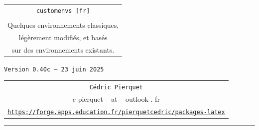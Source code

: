 \documentclass[french,11pt,a4paper]{article}
\def\TPversion{0.40c}
\def\TPdate{23 juin 2025}
\begin{document}
\pagestyle{fancy}

\thispagestyle{empty}

\begin{center}
	\begin{minipage}{0.75\linewidth}
	\begin{tcolorbox}[colframe=yellow,colback=yellow!15]
		\begin{center}
			\renewcommand\arraystretch{1.25}
			\begin{tabular}{c}
				{\Huge \texttt{customenvs [fr]}}\\
				\\
				{\Large Quelques environnements classiques,} \\
				{\Large légèrement modifiés, et basés} \\
				{\Large sur des environnements existants.} \\
			\end{tabular}
			\renewcommand\arraystretch{1}
			
			\medskip
			
			{\small \texttt{Version \TPversion{} -- \TPdate}}
		\end{center}
	\end{tcolorbox}
\end{minipage}
\end{center}

\vspace*{1mm}

\begin{center}
	\begin{tabular}{c}
	\texttt{Cédric Pierquet}\\
	{\ttfamily c pierquet -- at -- outlook . fr}\\
	\texttt{\url{https://forge.apps.education.fr/pierquetcedric/packages-latex}}
\end{tabular}
\end{center}

\vspace*{5mm}

%
%
%
%
%

\hrule


\hypertarget{matoc}{}
\end{document}
